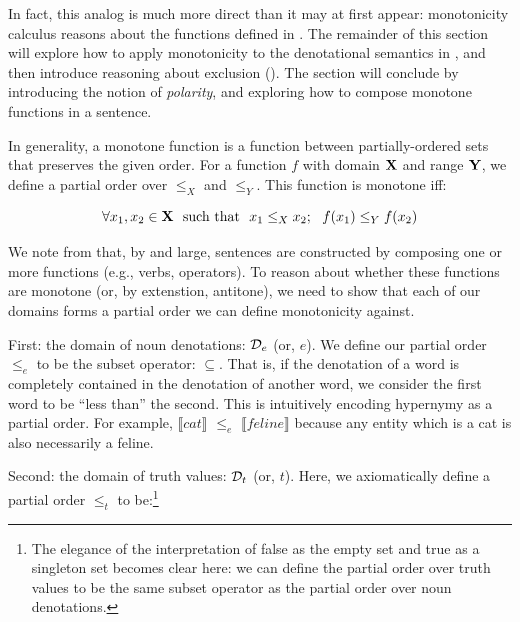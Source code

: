 In fact, this analog is much more direct than it may at first appear:
  monotonicity calculus reasons about the functions defined in 
  .
The remainder of this section will explore how to apply monotonicity to
  the denotational semantics in ,
  and then introduce reasoning about exclusion ().
The section will conclude by introducing the notion of \textit{polarity},
  and exploring how to compose monotone functions in a sentence.



%
%

In generality, a monotone function is a function between partially-ordered sets
  that preserves the given order.
For a function $f$ with domain $\mathbf{X}$ and range $\mathbf{Y}$, we define a partial order over
  $\leq_X$ and $\leq_Y$.
This function is monotone iff:

\begin{equation}
  \forall x_1, x_2 \in \mathbf{X} ~~ \textrm{such that} ~~ x_1 \leq_X x_2; ~~  f(x_1) \leq_Y f(x_2)
\end{equation}

We note from  that, by and large, sentences 
  are constructed by composing one or more functions (e.g., verbs, operators).
To reason about whether these functions are monotone (or, by extenstion, antitone),
  we need to show that each of our domains forms a partial order we can define
  monotonicity against.

First: the domain of noun denotations: $\mathcal{D}_e$ (or, $e$).
We define our partial order $\leq_e$ to be the subset operator: $\subseteq$.
That is, if the denotation of a word is completely contained in the denotation of
  another word, we consider the first word to be ``less than'' the second.
This is intuitively encoding hypernymy as a partial order.
For example, $\llbracket cat \rrbracket$ $\leq_e$ $\llbracket feline \rrbracket$ because
  any entity which is a cat is also necessarily a feline.

Second: the domain of truth values: $\mathcal{D}_t$ (or, $t$).
Here, we axiomatically define a partial order $\leq_t$ to be:\footnote{
    The elegance of the interpretation of false as the empty set and true as a singleton
    set becomes clear here: we can define the partial order over truth values to be the same
    subset operator as the partial order over noun denotations.
    }

